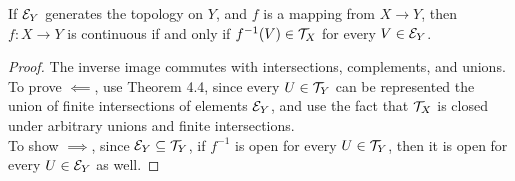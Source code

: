 \documentclass[../../main.tex]{subfiles}
\begin{document}
\begin{wts}
    If $\mathcal{E}_Y$ generates the topology on $Y$, and $f$ is a mapping from $X\to Y$, then $f:X\to Y$ is continuous if and only if $f^{-1}(V)\in \mathcal{T}_X$ for every $V\in \mathcal{E}_Y$.
\end{wts}
\begin{proof}
    The inverse image commutes with intersections, complements, and unions. To prove $\impliedby$, use Theorem 4.4, since every $U\in \mathcal{T}_Y$ can be represented the union of finite intersections of elements $\mathcal{E}_Y$, and use the fact that $\mathcal{T}_X$ is closed under arbitrary unions and finite intersections.\\
    
    To show $\implies$, since $\mathcal{E}_Y\subseteq \mathcal{T}_Y$, if $f^{-1}$ is open for every $U\in\mathcal{T}_Y$, then it is open for every $U\in \mathcal{E}_Y$ as well.
\end{proof}
\end{document}
